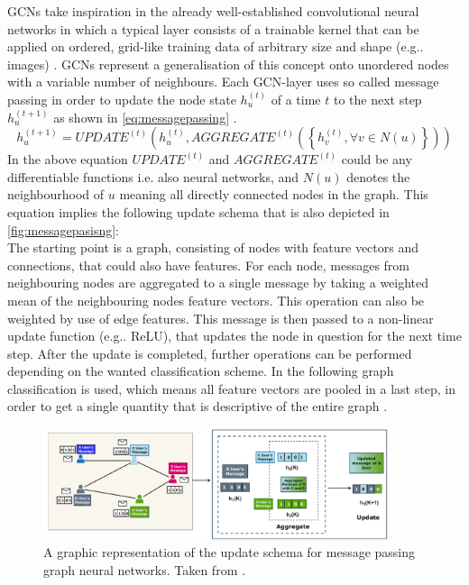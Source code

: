 \documentclass[11pt,a4paper]{article}
\begin{document}
GCNs take inspiration in the already well-established convolutional neural networks in which a typical layer consists of a trainable kernel that can be applied on ordered, grid-like training data of arbitrary size and shape (e.g.. images) \cite{khemaniReviewGraphNeural2024}. 
GCNs represent a generalisation of this concept onto unordered nodes with a variable number of neighbours. 
Each GCN-layer uses so called message passing in order to update the node state $h^{(t)}_u$ of a time $t$ to the next step $h^{(t+1)}_u$ as shown in \autoref{eq:messagepassing} \cite[eq. 4.1]{khemaniReviewGraphNeural2024}.
\begin{equation}
    h^{(t+1)}_u = UPDATE^{(t)}\left(h^{(t)}_u, AGGREGATE^{(t)}\left(\left\{h^{(t)}_v, \forall v \in N(u)\right\}\right)\right)
    \label{eq:messagepassing}
\end{equation}
In the above equation $UPDATE^{(t)}$ and $AGGREGATE^{(t)}$ could be any differentiable functions i.e. also neural networks, and $N(u)$ denotes the neighbourhood of $u$ meaning all directly connected nodes in the graph. 
This equation implies the following update schema that is also depicted in \autoref{fig:messagepasisng}: \\
The starting point is a graph, consisting of nodes with feature vectors and connections, that could also have features. 
For each node, messages from neighbouring nodes are aggregated to a single message by taking a weighted mean of the neighbouring nodes feature vectors. 
This operation can also be weighted by use of edge features. 
This message is then passed to a non-linear update function (e.g.. ReLU), that updates the node in question for the next time step. 
After the update is completed, further operations can be performed depending on the wanted classification scheme. 
In the following graph classification is used, which means all feature vectors are pooled in a last step, in order to get a single quantity that is descriptive of the entire graph \cite{khemaniReviewGraphNeural2024}.
\begin{figure}[htbp]
    \centering
    \includegraphics[width=0.9\textwidth]{images/khemani7.png}
    \caption{A graphic representation of the update schema for message passing graph neural networks. Taken from \cite[Fig. 7]{khemaniReviewGraphNeural2024}.}
    \label{fig:messagepasisng}
\end{figure}
\end{document}
